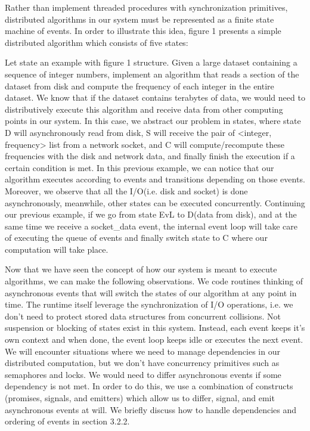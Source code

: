 \documentclass[10pt,reprint]{socc14}
\begin{document}
Rather than implement threaded procedures with synchronization primitives, distributed algorithms in our system  must be represented as a finite state machine of events. In order to illustrate this idea, figure 1 presents a simple distributed algorithm which consists of five states: 

Let state an example with figure 1 structure. Given a large dataset containing a sequence of integer numbers, implement an algorithm that reads a section of the dataset from disk and compute the frequency of each integer in the entire dataset. We know that if the dataset contains terabytes of data, we would need to distributively execute this algorithm and receive data from other computing points in our system. In this case, we abstract our problem in states, where state D will asynchronously read from disk, S will receive the pair of <integer, frequency> list from a network socket, and C will compute/recompute these frequencies with the disk and network data, and finally finish the execution if a certain condition is met. In this previous example, we can notice that our algorithm executes according to events and transitions depending on those events. Moreover, we observe that all the I/O(i.e. disk and socket) is done asynchronously, meanwhile, other states can be executed concurrently. Continuing our previous example, if  we go from state EvL to D(data from disk), and at the same time we receive a socket\_data event, the internal event loop will take care of executing the queue of events and finally switch state to C where our computation will take place.

Now that we have seen the concept of how our system is meant to execute algorithms, we can make the following observations.
We code routines thinking of asynchronous events that will switch the states of our algorithm at any point in time.
The runtime itself leverage the synchronization of I/O operations, i.e. we don’t need to protect stored data structures from concurrent collisions.
Not suspension or blocking of states exist in this system. Instead, each event keeps it’s own context and when done, the event loop keeps idle or executes the next event.
We will encounter situations where we need to manage dependencies in our distributed computation, but we don’t have concurrency primitives such as semaphores and locks. We would need to differ asynchronous events if some dependency is not met. In order to do this, we use a combination of constructs (promises, signals, and emitters) which allow us to differ, signal, and emit asynchronous events at will. We briefly discuss how to handle dependencies and ordering of events in section 3.2.2.
\end{document}
